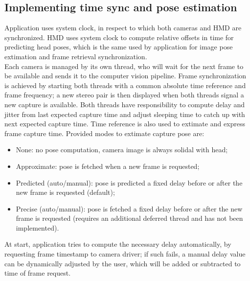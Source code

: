 \subsection{Implementing time sync and pose estimation}

Application uses system clock, in respect to which both cameras and HMD are synchronized. HMD uses system clock to compute relative offsets in time for predicting head poses, which is the same used by application for image pose extimation and frame retrieval synchronization.\\
Each camera is managed by its own thread, who will wait for the next frame to be available and sends it to the computer vision pipeline. Frame synchronization is achieved by starting both threads with a common absolute time reference and frame frequency; a new stereo pair is then displayed when both threads signal a new capture is available. Both threads have responsibility to compute delay and jitter from last expected capture time and adjust sleeping time to catch up with next expected capture time.
Time reference is also used to extimate and express frame capture time. Provided modes to extimate capture pose are:
\begin{itemize}
\item None: no pose computation, camera image is always solidal with head;
\item Approximate: pose is fetched when a new frame is requested;
\item Predicted (auto/manual): pose is predicted a fixed delay before or after the new frame is requested (default);
\item Precise (auto/manual): pose is fetched a fixed delay before or after the new frame is requested (requires an additional deferred thread and has not been implemented).
\end{itemize}
At start, application tries to compute the necessary delay automatically, by requesting frame timestamp to camera driver; if such fails, a manual delay value can be dynamically adjusted by the user, which will be added or subtracted to time of frame request.
